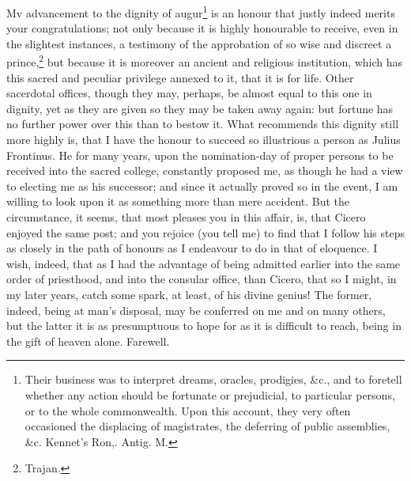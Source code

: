Mv advancement to the dignity of augur\footnote{Their business was to
interpret dreams, oracles, prodigies, \&c., and to foretell whether any
action should be fortunate or prejudicial, to particular persons, or to
the whole commonwealth. Upon this account, they very often occasioned the
displacing of magistrates, the deferring of public assemblies, \&c.
Kennet's Ron,. Antig. M.} is an honour that
justly indeed merits your congratulations; not only because it is highly
honourable to receive, even in the slightest instances, a testimony of the
approbation of so wise and discreet a prince,\footnote{Trajan.} but because it is
moreover an ancient and religious institution, which has this sacred and
peculiar privilege annexed to it, that it is for life. Other sacerdotal
offices, though they may, perhaps, be almost equal to this one in dignity,
yet as they are given so they may be taken away again: but fortune has no
further power over this than to bestow it. What recommends this dignity
still more highly is, that I have the honour to succeed so illustrious a
person as Julius Frontinus. He for many years, upon the nomination-day of
proper persons to be received into the sacred college, constantly proposed
me, as though he had a view to electing me as his successor; and since it
actually proved so in the event, I am willing to look upon it as something
more than mere accident. But the circumstance, it seems, that most pleases
you in this affair, is, that Cicero enjoyed the same post; and you rejoice
(you tell me) to find that I follow his steps as closely in the path of
honours as I endeavour to do in that of eloquence. I wish, indeed, that as
I had the advantage of being admitted earlier into the same order of
priesthood, and into the consular office, than Cicero, that so I might, in
my later years, catch some spark, at least, of his divine genius! The
former, indeed, being at man's disposal, may be conferred on me and on
many others, but the latter it is as presumptuous to hope for as it is
difficult to reach, being in the gift of heaven alone. Farewell.


